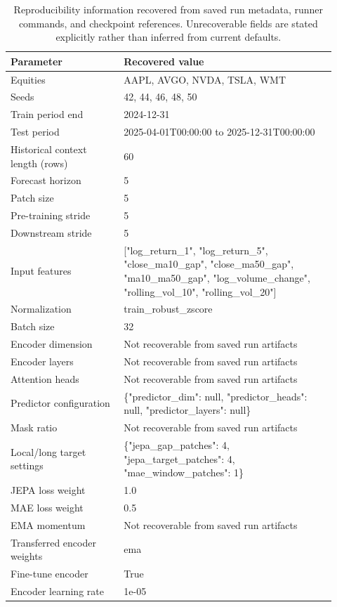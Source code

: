 \begin{table}[p]
\centering
\small
\caption{Reproducibility information recovered from saved run metadata, runner commands, and checkpoint references. Unrecoverable fields are stated explicitly rather than inferred from current defaults.}
\label{tab:reproducibility}
\begin{tabular}{p{0.32\linewidth}p{0.60\linewidth}}
\toprule
Parameter & Recovered value \\
\midrule
Equities & AAPL, AVGO, NVDA, TSLA, WMT \\
Seeds & 42, 44, 46, 48, 50 \\
Train period end & 2024-12-31 \\
Test period & 2025-04-01T00:00:00 to 2025-12-31T00:00:00 \\
Historical context length (rows) & 60 \\
Forecast horizon & 5 \\
Patch size & 5 \\
Pre-training stride & 5 \\
Downstream stride & 5 \\
Input features & ["log\_return\_1", "log\_return\_5", "close\_ma10\_gap", "close\_ma50\_gap", "ma10\_ma50\_gap", "log\_volume\_change", "rolling\_vol\_10", "rolling\_vol\_20"] \\
Normalization & train\_robust\_zscore \\
Batch size & 32 \\
Encoder dimension & Not recoverable from saved run artifacts \\
Encoder layers & Not recoverable from saved run artifacts \\
Attention heads & Not recoverable from saved run artifacts \\
Predictor configuration & \{"predictor\_dim": null, "predictor\_heads": null, "predictor\_layers": null\} \\
Mask ratio & Not recoverable from saved run artifacts \\
Local/long target settings & \{"jepa\_gap\_patches": 4, "jepa\_target\_patches": 4, "mae\_window\_patches": 1\} \\
JEPA loss weight & 1.0 \\
MAE loss weight & 0.5 \\
EMA momentum & Not recoverable from saved run artifacts \\
Transferred encoder weights & ema \\
Fine-tune encoder & True \\
Encoder learning rate & 1e-05 \\

\end{tabular}
\end{table}
